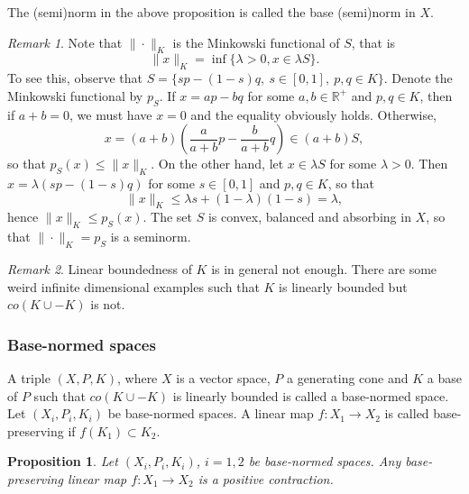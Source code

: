 \documentclass[12pt]{article}
\newtheorem{prop}{Proposition}
\theoremstyle{remark}
\newtheorem{rem}{Remark}
\newcommand{\<}{\langle}
\begin{document}
The (semi)norm in the above proposition  is called  the base (semi)norm in $X$. 

\begin{rem}
Note that $\|\cdot\|_K$ is the Minkowski functional of $S$, that is
\[
\|x\|_K= \inf\{\lambda>0, x\in \lambda S\}.
\]
To see this, observe that $S=\{s p-(1-s)q,\ s\in [0,1],\ p,q\in K\}$. Denote the Minkowski functional by $p_S$. If $x=ap-bq$ for some $a,b\in \mathbb R^+$ and $p,q\in K$, then if $a+b=0$, we must have 
$x=0$ and the equality obviously holds. Otherwise, 
\[
x=(a+b)(\frac a{a+b} p-\frac b{a+b} q)\in (a+b) S,
\]
so that $p_S(x)\le \|x\|_K$. On the other hand, let $x\in \lambda S$ for some $\lambda>0$. Then $x=\lambda(sp-(1-s)q)$ for some $s\in [0,1]$ and $p,q\in K$, so that 
\[
\|x\|_K\le \lambda s+(1-\lambda)(1-s)=\lambda,
\]
hence $\|x\|_K\le p_S(x)$. The set $S$ is convex, balanced and absorbing in $X$, so that $\|\cdot\|_K=p_S$ is a seminorm.  
\end{rem}




\begin{rem} Linear boundedness of $K$ is in general not enough. There are some weird infinite dimensional examples such that $K$ is linearly bounded but $co(K\cup -K)$ is not.

\end{rem}

\subsubsection*{Base-normed spaces}

A triple $(X,P,K)$, where $X$ is a vector space, $P$ a generating cone and $K$ a base of $P$ such that $co(K\cup-K)$ is linearly bounded is called a base-normed space. 
Let $(X_i,P_i,K_i)$ be base-normed spaces. A linear map $f:X_1\to X_2$ is called base-preserving if $f(K_1)\subset K_2$.


\begin{prop} Let $(X_i,P_i,K_i)$, $i=1,2$ be base-normed spaces. Any base-preserving linear  map $f:X_1\to X_2$ is a positive contraction.
\end{prop}


\end{document}
